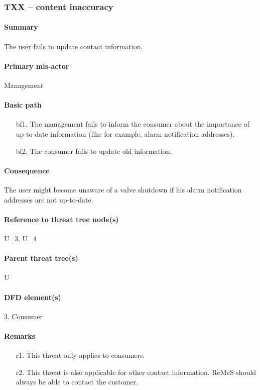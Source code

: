 \subsubsection{TXX -- content inaccuracy} %
\paragraph{Summary} The user fails to update contact information. 

\paragraph{Primary mis-actor} Management

\paragraph{Basic path}
\begin{enumerate}
	\item[bf1.]{The management fails to inform the consumer about the importance of
	up-to-date information (like for example, alarm notification addresses).}
    \item[bf2.]{The consumer fails to update old information.}
\end{enumerate}

\paragraph{Consequence} The user might become unaware of a valve shutdown if his
alarm notification addresses are not up-to-date.

\paragraph{Reference to threat tree node(s)} U_3, U_4

\paragraph{Parent threat tree(s)} U

\paragraph{DFD element(s)} 3. Consumer

\paragraph{Remarks}
\begin{enumerate}
     \item[r1.] This threat only applies to consumers.
     \item[r2.] This threat is also applicable for other contact information.
     ReMeS should always be able to contact the customer.
\end{enumerate}
